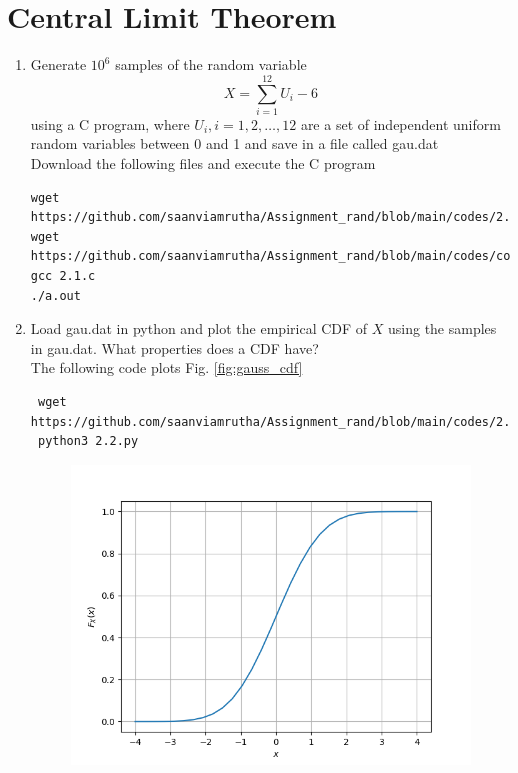\documentclass[journal,12pt,twocolumn]{IEEEtran}
\renewcommand\thesection{\arabic{section}}
\begin{document}
\section{Central Limit Theorem}
%
\begin{enumerate}[label=\thesection.\arabic*
,ref=\thesection.\theenumi]
%
\item
Generate $10^6$ samples of the random variable
%
\begin{equation}
X = \sum_{i=1}^{12}U_i -6
\end{equation}
%
using a C program, where $U_i, i = 1,2,\dots, 12$ are  a set of independent uniform random variables between 0 and 1
and save in a file called gau.dat
\\
\solution 
Download the following files and execute the C program
\begin{lstlisting}
wget https://github.com/saanviamrutha/Assignment_rand/blob/main/codes/2.1.c
wget https://github.com/saanviamrutha/Assignment_rand/blob/main/codes/coeffs.h
gcc 2.1.c
./a.out
\end{lstlisting}
\item
Load gau.dat in python and plot the empirical CDF of $X$ using the samples in gau.dat. What properties does a CDF have?
\\
\solution The following code plots Fig. \ref{fig:gauss_cdf}
\begin{lstlisting}
 wget https://github.com/saanviamrutha/Assignment_rand/blob/main/codes/2.2.py
 python3 2.2.py
\end{lstlisting}
\begin{figure}
\centering
\includegraphics[width=\columnwidth]{figures/cdf2.png}

\end{figure}
\end{enumerate}
\end{document}
